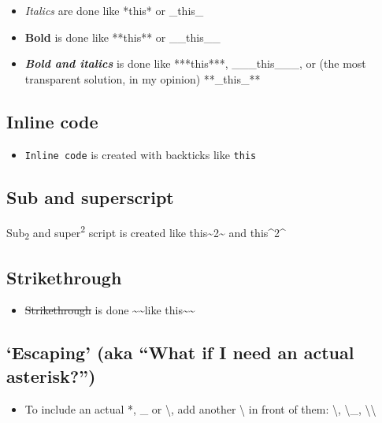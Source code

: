 \documentclass[a4paper, nobind]{templates/ociamthesis}
\providecommand{\tightlist}{%
  \setlength{\itemsep}{0pt}\setlength{\parskip}{0pt}}
\begin{document}
\begin{itemize}
\tightlist
\item
  \emph{Italics} are done like *this* or \_this\_
\item
  \textbf{Bold} is done like **this** or \_\_this\_\_
\item
  \textbf{\emph{Bold and italics}} is done like ***this***, \_\_\_this\_\_\_, or (the most transparent solution, in my opinion) **\_this\_**
\end{itemize}

\hypertarget{inline-code}{%
\subsection{Inline code}\label{inline-code}}

\begin{itemize}
\tightlist
\item
  \texttt{Inline\ code} is created with backticks like \texttt{\textasciigrave{}this\textasciigrave{}}
\end{itemize}

\hypertarget{sub-and-superscript}{%
\subsection{Sub and superscript}\label{sub-and-superscript}}

Sub\textsubscript{2} and super\textsuperscript{2} script is created like this\textasciitilde2\textasciitilde{} and this\^{}2\^{}

\hypertarget{strikethrough}{%
\subsection{Strikethrough}\label{strikethrough}}

\begin{itemize}
\tightlist
\item
  \sout{Strikethrough} is done \textasciitilde\textasciitilde like this\textasciitilde\textasciitilde{}
\end{itemize}

\hypertarget{escaping-aka-what-if-i-need-an-actual-asterisk}{%
\subsection{`Escaping' (aka ``What if I need an actual asterisk?'')}\label{escaping-aka-what-if-i-need-an-actual-asterisk}}

\begin{itemize}
\tightlist
\item
  To include an actual *, \_ or \textbackslash, add another \textbackslash{} in front of them: \textbackslash*, \textbackslash\_, \textbackslash\textbackslash{}
\end{itemize}
\end{document}
